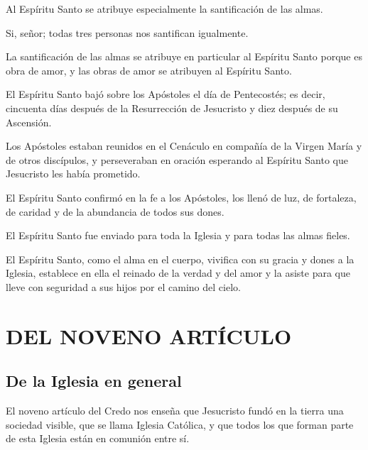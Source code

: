  Al Espíritu
Santo se atribuye especialmente la santificación de las almas.

Si, señor; todas tres personas nos santifican igualmente.

 La santificación de las almas se atribuye en particular al
Espíritu Santo porque es obra de amor, y las obras de amor se atribuyen al
Espíritu Santo.

 El Espíritu Santo
bajó sobre los Apóstoles el día de Pentecostés; es decir, cincuenta días después de
la Resurrección de Jesucristo y diez después de su Ascensión.

Los Apóstoles estaban reunidos en el Cenáculo en compañía de la Virgen María y
de otros discípulos, y perseveraban en oración esperando al Espíritu Santo que
Jesucristo les había prometido.

 El Espíritu
Santo confirmó en la fe a los Apóstoles, los llenó de luz, de fortaleza, de caridad y de la abundancia de todos sus dones.

 El Espíritu
Santo fue enviado para toda la Iglesia y para todas las almas fieles.

 El Espíritu Santo, como el
alma en el cuerpo, vivifica con su gracia y dones a la Iglesia, establece en ella el
reinado de la verdad y del amor y la asiste para que lleve con seguridad a sus hijos
por el camino del cielo.

\section{DEL NOVENO ARTÍCULO}
\setcounter{sub}{1}
\subsection{De la Iglesia en general}

 El noveno artículo del
Credo nos enseña que Jesucristo fundó en la tierra una sociedad visible, que se
llama Iglesia Católica, y que todos los que forman parte de esta Iglesia están en
comunión entre sí.

